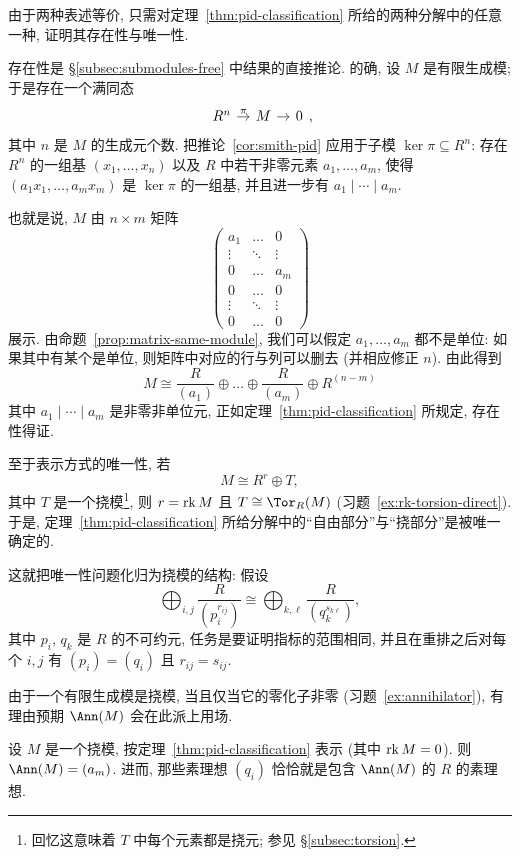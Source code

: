 由于两种表述等价, 只需对定理~\ref{thm:pid-classification} 所给的两种分解中的任意一种, 证明其存在性与唯一性.

存在性是 §\ref{subsec:submodules-free} 中结果的直接推论. 的确, 设 $M$ 是有限生成模; 于是存在一个满同态
$$
\begin{tikzcd}[column sep=.9em]
R^n \ar[r,"\pi"] & M \ar[r] & 0
\end{tikzcd},
$$
其中 $n$ 是 $M$ 的生成元个数. 把推论~\ref{cor:smith-pid} 应用于子模 $\ker\pi\subseteq R^n$: 存在 $R^n$ 的一组基 $(x_1,\ldots,x_n)$ 以及 $R$ 中若干非零元素 $a_1,\ldots,a_m$, 使得 $(a_1x_1,\ldots,a_mx_m)$ 是 $\ker\pi$ 的一组基, 并且进一步有 $a_1\mid\cdots\mid a_m$.

也就是说, $M$ 由 $n\times m$ 矩阵
$$
\begin{pmatrix}
a_1 & \dots & 0\\
\vdots & \ddots & \vdots\\
0 & \dots & a_m\\
0 & \dots & 0\\
\vdots & \ddots & \vdots\\
0 & \dots & 0
\end{pmatrix}
$$
展示. 由命题~\ref{prop:matrix-same-module}, 我们可以假定 $a_1,\ldots,a_m$ 都不是单位: 如果其中有某个是单位, 则矩阵中对应的行与列可以删去 (并相应修正 $n$). 由此得到
$$
M\cong\frac{R}{(a_1)}\oplus\dots\oplus\frac{R}{(a_m)}\oplus R^{(n-m)}
$$
其中 $a_1\mid\cdots\mid a_m$ 是非零非单位元, 正如定理~\ref{thm:pid-classification} 所规定, 存在性得证.

至于表示方式的唯一性, 若
$$
M\cong R^r\oplus T,
$$
其中 $T$ 是一个挠模\footnote{回忆这意味着 $T$ 中每个元素都是挠元; 参见 §\ref{subsec:torsion}.}, 则 $r=\operatorname{rk} M$ 且 $T\cong\Tor_R(M)$ (习题~\ref{ex:rk-torsion-direct}). 于是, 定理~\ref{thm:pid-classification} 所给分解中的``自由部分''与``挠部分''是被唯一确定的.

这就把唯一性问题化归为挠模的结构: 假设
\begin{equation}\label{eq:pid-uniqueness-star}
\bigoplus_{i,j}\frac{R}{(p_i^{r_{ij}})}\cong\bigoplus_{k,\ell}\frac{R}{(q_k^{s_{k\ell}})},
\tag{*}
\end{equation}
其中 $p_i$, $q_k$ 是 $R$ 的不可约元, 任务是要证明指标的范围相同, 并且在重排之后对每个 $i,j$ 有 $(p_i)=(q_i)$ 且 $r_{ij}=s_{ij}$.

由于一个有限生成模是挠模, 当且仅当它的零化子非零 (习题~\ref{ex:annihilator}), 有理由预期 $\Ann(M)$ 会在此派上用场.

\begin{lemma}\label{lem:ann-pid}
设 $M$ 是一个挠模, 按定理~\ref{thm:pid-classification} 表示 (其中 $\operatorname{rk} M=0$). 则 $\Ann(M)=(a_m)$. 进而, 那些素理想 $(q_i)$ 恰恰就是包含 $\Ann(M)$ 的 $R$ 的素理想.
\end{lemma}

